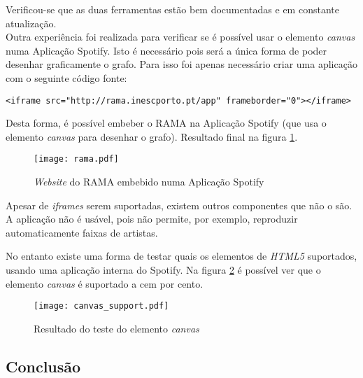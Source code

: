     Verificou-se que as duas ferramentas estão bem documentadas e em constante atualização. \\

    Outra experiência foi realizada para verificar se é possível usar o elemento \emph{canvas} numa Aplicação Spotify.
    Isto é necessário pois será a única forma de poder desenhar graficamente o grafo.
    Para isso foi apenas necessário criar uma aplicação com o seguinte código fonte:

    \begin{lstlisting}[caption={Elemento \emph{iframe} que embebe o \emph{website} do RAMA na aplicação}]
      <iframe src="http://rama.inescporto.pt/app" frameborder="0"></iframe>\end{lstlisting}

    Desta forma, é possível embeber o RAMA na Aplicação Spotify (que usa o elemento \emph{canvas} para desenhar o grafo).
    Resultado final na figura \ref{fig:rama_spotifyed}.

    \begin{figure}
      \begin{center}
        \texttt{[image: rama.pdf]}
      \end{center}
      \caption{\emph{Website} do RAMA embebido numa Aplicação Spotify}
      \label{fig:rama_spotifyed}
    \end{figure}

    Apesar de \emph{iframes} serem suportadas, existem outros componentes que não o são.
    A aplicação não é usável, pois não permite, por exemplo, reproduzir automaticamente faixas de artistas.

    No entanto existe uma forma de testar quais os elementos de \emph{HTML5} suportados, usando uma aplicação interna do Spotify.
    Na figura \ref{fig:canvas_support} é possível ver que o elemento \emph{canvas} é suportado a cem por cento.

    \begin{figure}
       \begin{center}
         \texttt{[image: canvas\_support.pdf]}
       \end{center}
       \caption{Resultado do teste do elemento \emph{canvas}}
       \label{fig:canvas_support}
     \end{figure}


  \subsection{Conclusão} %
  \label{sub:conclusao}
  
